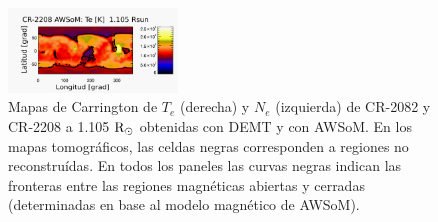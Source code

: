 \documentclass[baaa]{baaa}
\begin{document}
\begin{figure}
  \includegraphics[width=0.4\textwidth]{figuras/map_Te_awsom_2208_185_short_1105_Rsun_2.pdf}
    \caption{Mapas de Carrington de $T_e$ (derecha) y $N_e$ (izquierda) de CR-2082 y CR-2208 a 1.105 ${\rm R_\odot}$ obtenidas con DEMT y con AWSoM. En los mapas tomográficos, las celdas negras corresponden a regiones no reconstruídas. En todos los paneles las curvas negras indican las fronteras entre las regiones magnéticas abiertas y cerradas (determinadas en base al modelo magnético de AWSoM).}
  \label{fig-carrington}
\end{figure}


\end{document}
